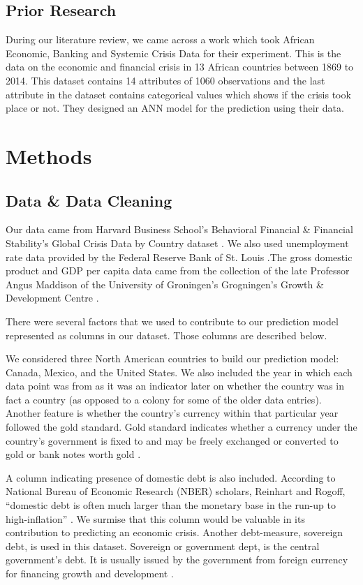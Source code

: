\documentclass[12pt]{article}
\begin{document}
\subsection{Prior Research}

During our literature review, we came across a work which took African Economic, Banking and Systemic Crisis Data for their experiment. This is the data on the economic and financial crisis in 13 African countries between 1869 to 2014. This dataset contains 14 attributes of 1060 observations and the last attribute in the dataset contains categorical values which shows if the crisis took place or not. They designed an ANN model for the prediction using their data. 

\section{Methods}
\subsection{Data \& Data Cleaning}
Our data came from Harvard Business School’s Behavioral Financial & Financial Stability’s Global Crisis Data by Country dataset \cite{harvard}. We also used unemployment rate data provided by the Federal Reserve Bank of St. Louis \cite{fred}.The gross domestic product and GDP per capita data came from the collection of the late Professor Angus Maddison of the University of Groningen’s Grogningen’s Growth & Development Centre \cite{ggdc}.

There were several factors that we used to contribute to our prediction model represented as columns in our dataset. Those columns are described below.

We considered three North American countries to build our prediction model: Canada, Mexico, and the United States. We also included the year in which each data point was from as it was an indicator later on whether the country was in fact a country (as opposed to a colony for some of the older data entries). 
Another feature is whether the country’s currency within that particular year followed the gold standard. Gold standard indicates whether a currency under the country’s government is fixed to and may be freely exchanged or converted to gold or bank notes worth gold \cite{chengold}.

A column indicating presence of domestic debt is also included. According to National Bureau of Economic Research (NBER) scholars, Reinhart and Rogoff, “domestic debt is often much larger than the monetary base in the run-up to high-inflation” \cite{nber}. We surmise that this column would be valuable in its contribution to predicting an economic crisis. Another debt-measure, sovereign debt, is used in this dataset. Sovereign or government dept, is the central government's debt. It is usually issued by the government from foreign currency for financing growth and development \cite{chensovereign}.
\end{document}
